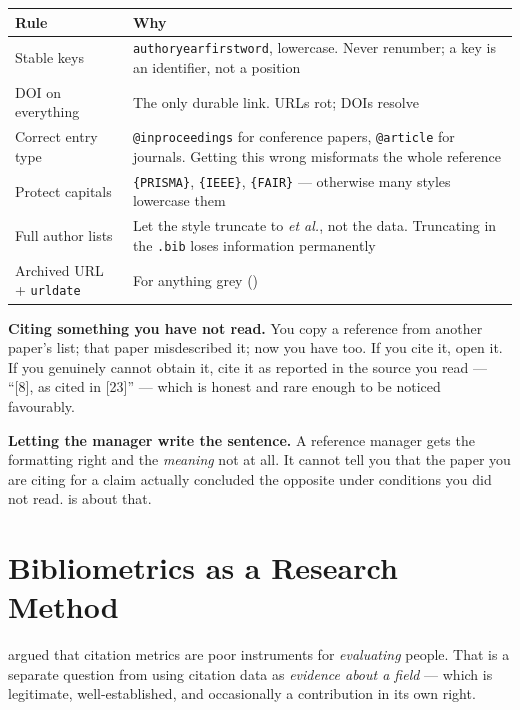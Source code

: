 \begin{center}
\small
\begin{tabular}{@{}L{3.0cm}L{11.3cm}@{}}
\toprule
\textbf{Rule} & \textbf{Why} \\
\midrule
Stable keys      & \texttt{author\-year\-firstword}, lowercase. Never renumber;
                   a key is an identifier, not a position \\
DOI on everything & The only durable link. URLs rot; DOIs resolve \\
Correct entry type & \texttt{@inproceedings} for conference papers,
                   \texttt{@article} for journals. Getting this wrong misformats
                   the whole reference \\
Protect capitals & \verb|{PRISMA}|, \verb|{IEEE}|, \verb|{FAIR}| --- otherwise
                   many styles lowercase them \\
Full author lists & Let the style truncate to \emph{et al.}, not the data.
                   Truncating in the \texttt{.bib} loses information permanently \\
Archived URL + \texttt{urldate} & For anything grey () \\
\bottomrule
\end{tabular}
\end{center}

\begin{pitfall}
\textbf{Citing something you have not read.} You copy a reference from another
paper's list; that paper misdescribed it; now you have too. If you cite it, open
it. If you genuinely cannot obtain it, cite it as reported in the source you
read --- ``[8], as cited in [23]'' --- which is honest and rare enough to be
noticed favourably.

\medskip
\textbf{Letting the manager write the sentence.} A reference manager gets the
formatting right and the \emph{meaning} not at all. It cannot tell you that the
paper you are citing for a claim actually concluded the opposite under
conditions you did not read.  is about that.
\end{pitfall}

\section{Bibliometrics as a Research Method}

 argued that citation metrics are poor instruments for
\emph{evaluating} people. That is a separate question from using citation data
as \emph{evidence about a field} --- which is legitimate, well-established, and
occasionally a contribution in its own right.

